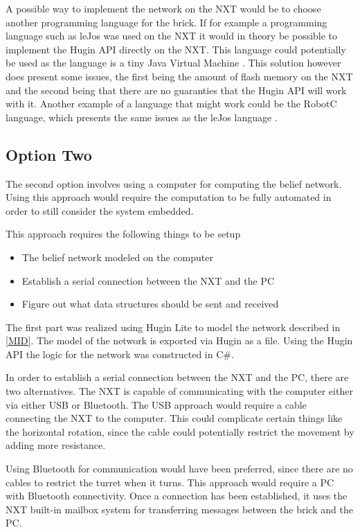 A possible way to implement the network on the NXT would be to choose another
programming language for the brick. If for example a programming language such
as leJos was used on the NXT it would in theory be possible to implement the
Hugin API directly on the NXT. This language could potentially be used as the
language is a tiny Java Virtual Machine \cite{LeJos}. This solution however
does present some issues, the first being the amount of flash memory on the NXT and the second
being that there are no guaranties that the Hugin API will work with it. Another
example of a language that might work could be the RobotC language, which
presents the same issues as the leJos language \cite{RobotC}.

\subsection{Option Two}
The second option involves using a computer for computing the
belief network. Using this approach would require the computation to be fully
automated in order to still consider the system embedded.\nl

This approach requires the following things to be setup
\begin{itemize}
\item The belief network modeled on the computer
\item Establish a serial connection between the NXT and the PC
\item Figure out what data structures should be sent and received
\end{itemize}

The first part was realized using Hugin Lite to model the network described
in \autoref{MID}. The model of the network is exported via Hugin as a file.
Using the Hugin API the logic for the network was constructed in C\#.\nl

In order to establish a serial connection between the NXT and the PC, there are
two alternatives. The NXT is capable of communicating with the computer either
via either USB or Bluetooth. The USB approach would require a cable connecting
the NXT to the computer.
This could complicate certain things like the horizontal rotation, since the
cable could potentially restrict the movement by adding more resistance.\nl

Using Bluetooth for communication would have been preferred, since there are
no cables to restrict the turret when it turns.
This approach would require a PC with Bluetooth connectivity. Once a connection
has been established, it uses the NXT built-in mailbox system for transferring
messages between the brick and the PC.\nl

